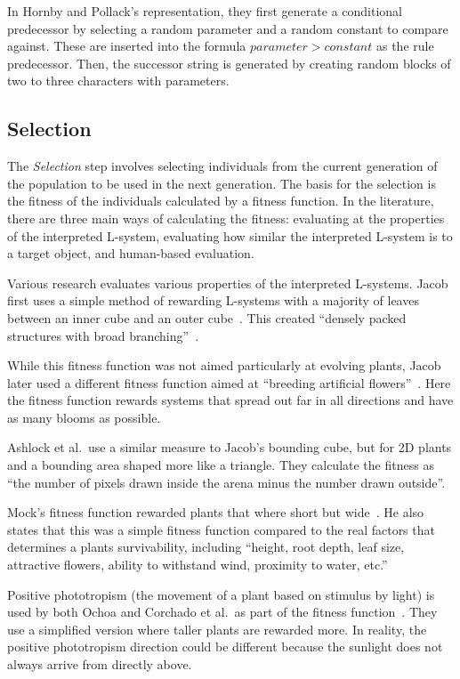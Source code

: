 In Hornby and Pollack's representation, they first generate a conditional predecessor by selecting a random parameter and a random constant to compare against.
These are inserted into the formula $parameter > constant$ as the rule predecessor.
Then, the successor string is generated by creating random blocks of two to three characters with parameters.~\cite{2001Hornby}

\subsection{Selection}
The \textit{Selection} step involves selecting individuals from the current generation of the population to be used in the next generation.
The basis for the selection is the fitness of the individuals calculated by a fitness function.
In the literature, there are three main ways of calculating the fitness: evaluating at the properties of the interpreted \gls{L-system}, evaluating how similar the interpreted \gls{L-system} is to a target object, and human-based evaluation.

Various research evaluates various properties of the interpreted \glspl{L-system}.
Jacob first uses a simple method of rewarding \glspl{L-system} with a majority of leaves between an inner cube and an outer cube~\cite{1994Jacob}.
This created ``densely packed structures with broad branching''~\cite{1994Jacob}.

While this fitness function was not aimed particularly at evolving plants, Jacob later used a different fitness function aimed at ``breeding artificial flowers''~\cite{1994Jacob}.
Here the fitness function rewards systems that spread out far in all directions and have as many blooms as possible.

Ashlock et al.\ use a similar measure to Jacob's bounding cube, but for 2D plants and a bounding area shaped more like a triangle.
They calculate the fitness as ``the number of pixels drawn inside the arena minus the number drawn outside''.
~\cite{2006Ashlock}

Mock's fitness function rewarded plants that where short but wide~\cite{1998Mock}.
He also states that this was a simple fitness function compared to the real factors that determines a plants survivability, including ``height, root depth, leaf size, attractive flowers, ability to withstand wind, proximity to water, etc.''~\cite{1998Mock}

Positive phototropism (the movement of a plant based on stimulus by light) is used by both Ochoa and Corchado et al.\ as part of the fitness function~\cite{1998Ochoa, 2009Corchado}.
They use a simplified version where taller plants are rewarded more.
In reality, the positive phototropism direction could be different because the sunlight does not always arrive from directly above.

